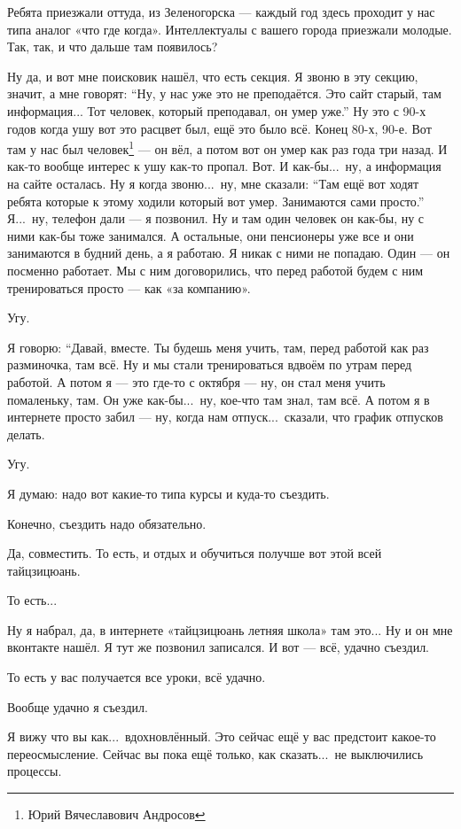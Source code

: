 \A
Ребята приезжали оттуда, из Зеленогорска --- каждый год здесь проходит у нас
типа аналог «что где когда». Интеллектуалы с вашего города приезжали молодые.
Так, так, и что дальше там появилось?

\I
Ну да, и вот мне поисковик нашёл, что есть секция. Я звоню в эту секцию, значит, а мне говорят:
``Ну, у нас уже это не преподаётся. Это сайт старый, там информация...
Тот человек, который преподавал, он умер уже.''
Ну это с 90-х годов когда ушу вот это расцвет был, ещё это было всё.
Конец 80-х, 90-е. Вот там у
нас был человек\footnote*{Юрий Вячеславович Андросов} --- он вёл, а потом вот он умер как раз года
три
назад. И как-то вообще интерес к ушу как-то пропал. Вот. И как-бы...\ ну, а информация на сайте
осталась.
Ну я когда звоню...\ ну, мне сказали: ``Там ещё вот ходят ребята которые к этому ходили который
вот умер. Занимаются сами просто.''
Я...\ ну, телефон дали --- я позвонил. Ну и там один человек он как-бы, ну с ними как-бы тоже
занимался. А остальные, они пенсионеры уже все и они занимаются в будний день, а я работаю.
Я никак с ними не попадаю. Один --- он посменно работает. Мы с ним договорились, что перед
работой будем
с ним тренироваться просто --- как «за компанию».

\A
Угу.

\I
Я говорю: ``Давай, вместе. Ты будешь меня учить, там, перед работой как раз разминочка, там всё.
Ну и мы стали тренироваться вдвоём по утрам перед работой.
А потом я --- это где-то с октября --- ну, он стал меня учить помаленьку, там.
Он уже как-бы...\ ну, кое-что там знал, там всё.
А потом я в интернете просто забил --- ну, когда нам отпуск...\ сказали, что график отпусков
делать.

\A
Угу.

\I
Я думаю: надо вот какие-то типа курсы и куда-то съездить.

\A
Конечно, съездить надо обязательно.

\I
Да, совместить. То есть, и отдых и обучиться получше вот этой всей тайцзицюань.

\A
То есть...

\I
Ну я набрал, да, в интернете «тайцзицюань летняя школа» там это...
Ну и он мне вконтакте нашёл. Я тут же позвонил записался. И вот --- всё, удачно съездил.

\A
То есть у вас получается все уроки, всё удачно.

\I
Вообще удачно я съездил.

\A
Я вижу что вы как...\ вдохновлённый.
Это сейчас ещё у вас предстоит какое-то переосмысление.
Сейчас вы пока ещё только, как сказать...\
не выключились процессы.

